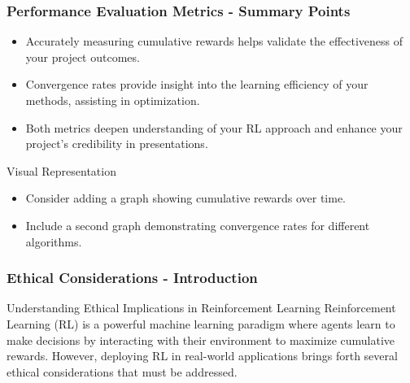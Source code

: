 \documentclass[aspectratio=169]{beamer}
\begin{document}
\begin{frame}[fragile]
    \frametitle{Performance Evaluation Metrics - Summary Points}
    \begin{itemize}
        \item Accurately measuring cumulative rewards helps validate the effectiveness of your project outcomes.
        \item Convergence rates provide insight into the learning efficiency of your methods, assisting in optimization.
        \item Both metrics deepen understanding of your RL approach and enhance your project's credibility in presentations.
    \end{itemize}
    \begin{block}{Visual Representation}
        \begin{itemize}
            \item Consider adding a graph showing cumulative rewards over time.
            \item Include a second graph demonstrating convergence rates for different algorithms.
        \end{itemize}
    \end{block}
\end{frame}

\begin{frame}[fragile]
    \frametitle{Ethical Considerations - Introduction}
    \begin{block}{Understanding Ethical Implications in Reinforcement Learning}
        Reinforcement Learning (RL) is a powerful machine learning paradigm where agents learn to make decisions by interacting with their environment to maximize cumulative rewards. However, deploying RL in real-world applications brings forth several ethical considerations that must be addressed.
    \end{block}
\end{frame}
\end{document}

